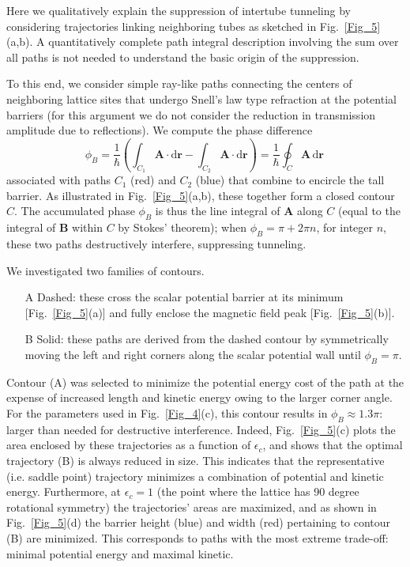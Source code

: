 \documentclass[aps,pra,twocolumn,showpacs,superscriptaddress,floatfix,longbibliography]{revtex4-1}
\def\Add{{\mathbf A}}
\def\Bdd{{\mathbf B}}
\begin{document}
Here we qualitatively explain the suppression of intertube tunneling by considering trajectories linking neighboring tubes as sketched in Fig.~\ref{Fig_5}(a,b).
A quantitatively complete path integral description involving the sum over all paths is not needed to understand the basic origin of the suppression.

To this end, we consider simple ray-like paths connecting the centers of neighboring lattice sites that undergo Snell's law type refraction at the potential barriers (for this argument we do not consider the reduction in transmission amplitude due to reflections).
We compute the phase difference
\begin{equation}
\phi_B = \frac{1}{\hbar} \left( \int_{C_1} \Add \cdot \mathrm{d} \boldsymbol{r} - \int_{C_2} \Add \cdot \mathrm{d} \boldsymbol{r} \right) = \frac{1}{\hbar} \oint_{C} \Add \, \mathrm{d} \boldsymbol{r}  \, \label{phi_B_def}
\end{equation}
associated with paths $C_1$ (red) and $C_2$ (blue) that combine to encircle the tall barrier.
As illustrated in Fig.~\ref{Fig_5}(a,b), these together form a closed contour $C$.
The accumulated phase $\phi_B$ is thus the line integral of $\Add$ along $C$ (equal to the integral of $\Bdd$ within $C$ by Stokes' theorem); when $\phi_B = \pi + 2\pi n$, for integer $n$, these two paths destructively interfere, suppressing tunneling.

We investigated two families of contours.
%
\begin{enumerate}

\item[A] Dashed: these cross the scalar potential barrier at its minimum [Fig.~\ref{Fig_5}(a)] and fully enclose the magnetic field peak [Fig.~\ref{Fig_5}(b)].

\item[B] Solid: these paths are derived from the dashed contour by symmetrically moving the left and right corners along the scalar potential wall until $\phi_B = \pi$.
\end{enumerate}

Contour (A) was selected to minimize the potential energy cost of the path at the expense of increased length and kinetic energy owing to the larger corner angle.
For the parameters used in Fig.~\ref{Fig_4}(c), this contour results in $\phi_B \approx 1.3 \pi$: larger than needed for destructive interference.
Indeed, Fig.~\ref{Fig_5}(c) plots the area enclosed by these trajectories as a function of $\epsilon_c$, and shows that the optimal trajectory (B) is always reduced in size.
This indicates that the representative (i.e. saddle point) trajectory minimizes a combination of potential and kinetic energy.
Furthermore, at $\epsilon_c=1$ (the point where the lattice has 90 degree rotational symmetry) the trajectories' areas are maximized, and as shown in Fig.~\ref{Fig_5}(d) the barrier height (blue) and width (red) pertaining to contour (B) are minimized.
This corresponds to paths with the most extreme trade-off: minimal potential energy and maximal kinetic. 
\end{document}

